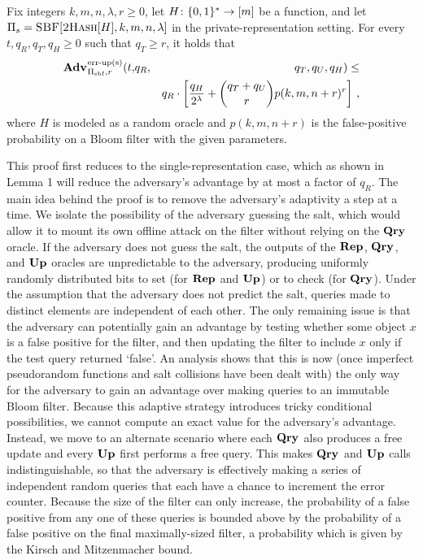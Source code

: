 \begin{theorem}\label{thm:bf-priv-salt-bound}
Fix integers $k, m, n, \lambda, r\geq 0$, let $H \colon \{0,1\}^* \to [m]$ be a function, and let $\mathrm{\Pi}_s = \textsc{SBF}[\textsc{2Hash}[H],k,m,n,\lambda]$ in the private-representation setting.
  For every $t, q_R, q_T, q_H \geq 0$ such that $q_T \geq r$, it holds that
  \begin{eqnarray*}
    \Adv{\erreps}_{\struct_\saltybloom,r}(t,&q_R,& q_T, q_U, q_H) \leq \\ && q_R \cdot
     \left[
      \frac{q_H}{2^\lambda} +
      {\dbinom{q_T+q_U}{r}} p(k, m, n+r)^r
    \right] \,,
\end{eqnarray*}
where $H$ is modeled as a random oracle and $p(k, m, n+r)$ is the false-positive probability on a Bloom filter with the given parameters.
\end{theorem}

This proof first reduces to the single-representation case, which as shown in Lemma 1 will reduce the adversary's advantage by at most a factor of $q_R$. The main idea behind the proof is to remove the adversary's adaptivity a step at a time. We isolate the possibility of the adversary guessing the salt, which would allow it to mount its own offline attack on the filter without relying on the $\mathbf{Qry}\hspace{0.5pt}$ oracle. If the adversary does not guess the salt, the outputs of the $\mathbf{Rep}\hspace{0.5pt}$, $\mathbf{Qry}\hspace{0.5pt}$, and $\mathbf{Up}\hspace{0.5pt}$ oracles are unpredictable to the adversary, producing uniformly randomly distributed bits to set (for $\mathbf{Rep}\hspace{0.5pt}$ and $\mathbf{Up}\hspace{0.5pt}$) or to check (for $\mathbf{Qry}\hspace{0.5pt}$). Under the assumption that the adversary does not predict the salt, queries made to distinct elements are independent of each other. The only remaining issue is that the adversary can potentially gain an advantage by testing whether some object $x$ is a false positive for the filter, and then updating the filter to include $x$ only if the test query returned `false'. An analysis shows that this is now (once imperfect pseudorandom functions and salt collisions have been dealt with) the only way for the adversary to gain an advantage over making queries to an immutable Bloom filter. Because this adaptive strategy introduces tricky conditional possibilities, we cannot compute an exact value for the adversary's advantage. Instead, we move to an alternate scenario where each $\mathbf{Qry}\hspace{0.5pt}$ also produces a free update and every $\mathbf{Up}\hspace{0.5pt}$ first performs a free query. This makes $\mathbf{Qry}\hspace{0.5pt}$ and $\mathbf{Up}\hspace{0.5pt}$ calls indistinguishable, so that the adversary is effectively making a series of independent random queries that each have a chance to increment the error counter. Because the size of the filter can only increase, the probability of a false positive from any one of these queries is bounded above by the probability of a false positive on the final maximally-sized filter, a probability which is given by the Kirsch and Mitzenmacher bound.

